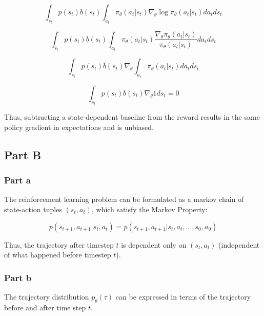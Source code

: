 \documentclass{article}
\begin{document}
    \begin{equation*}
        \int_{s_t} p(s_t) b(s_t) \int_{a_t} \pi_\theta (a_t|s_t)\nabla_\theta \log \pi_\theta(a_t|s_t)da_t ds_t
    \end{equation*}

    \begin{equation*}
        \int_{s_t} p(s_t) b(s_t) \int_{a_t} \pi_\theta (a_t|s_t) \frac{\nabla_\theta \pi_\theta(a_t|s_t)}{\pi_\theta(a_t|s_t)} da_t ds_t
    \end{equation*}

    \begin{equation*}
        \int_{s_t} p(s_t) b(s_t) \nabla_\theta \int_{a_t} \pi_\theta (a_t|s_t) da_t ds_t
    \end{equation*}

    \begin{equation*}
        \int_{s_t} p(s_t) b(s_t) \nabla_\theta 1 ds_t = 0
    \end{equation*}

    Thus, subtracting a state-dependent baseline from the reward results in the same policy gradient
    in expectations and is unbiased.

    \subsection{Part B}

    \subsubsection{Part a}
    The reinforcement learning problem can be formulated as a markov chain 
    of state-action tuples $(s_t,a_t)$, which satisfy the Markov Property:

    \begin{equation*}
        p(s_{t+1}, a_{t+1}| s_{t}, a_{t}) = p(s_{t+1}, a_{t+1} | s_{t}, a_{t}, \ldots , s_0, a_0 )
    \end{equation*}

    Thus, the trajectory after timestep $t$ is dependent only on $(s_t, a_t)$
    (independent of what happened before timestep $t$).


    \subsubsection{Part b}

    The trajectory distribution $p_\theta(\tau)$ can be expressed in terms of the 
    trajectory before and after time step $t$.
\end{document}
